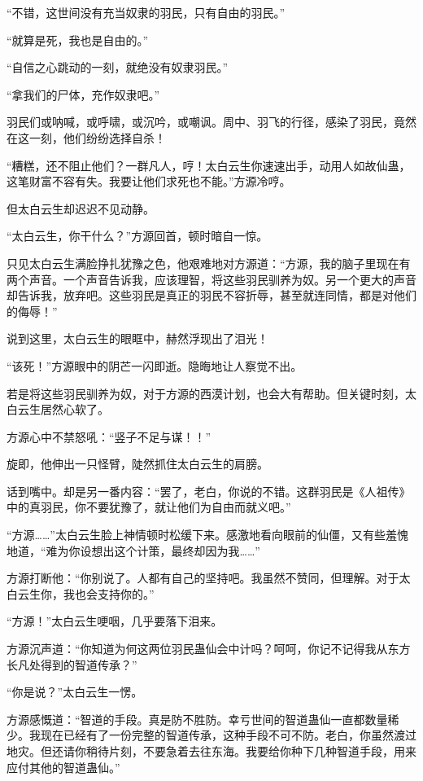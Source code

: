 \begin{this_body}
“不错，这世间没有充当奴隶的羽民，只有自由的羽民。”

“就算是死，我也是自由的。”

“自信之心跳动的一刻，就绝没有奴隶羽民。”

“拿我们的尸体，充作奴隶吧。”

羽民们或呐喊，或呼啸，或沉吟，或嘲讽。周中、羽飞的行径，感染了羽民，竟然在这一刻，他们纷纷选择自杀！

“糟糕，还不阻止他们？一群凡人，哼！太白云生你速速出手，动用人如故仙蛊，这笔财富不容有失。我要让他们求死也不能。”方源冷哼。

但太白云生却迟迟不见动静。

“太白云生，你干什么？”方源回首，顿时暗自一惊。

只见太白云生满脸挣扎犹豫之色，他艰难地对方源道：“方源，我的脑子里现在有两个声音。一个声音告诉我，应该理智，将这些羽民驯养为奴。另一个更大的声音却告诉我，放弃吧。这些羽民是真正的羽民不容折辱，甚至就连同情，都是对他们的侮辱！”

说到这里，太白云生的眼眶中，赫然浮现出了泪光！

“该死！”方源眼中的阴芒一闪即逝。隐晦地让人察觉不出。

若是将这些羽民驯养为奴，对于方源的西漠计划，也会大有帮助。但关键时刻，太白云生居然心软了。

方源心中不禁怒吼：“竖子不足与谋！！”

旋即，他伸出一只怪臂，陡然抓住太白云生的肩膀。

话到嘴中。却是另一番内容：“罢了，老白，你说的不错。这群羽民是《人祖传》中的真羽民，你不要犹豫了，就让他们为自由而就义吧。”

“方源……”太白云生脸上神情顿时松缓下来。感激地看向眼前的仙僵，又有些羞愧地道，“难为你设想出这个计策，最终却因为我……”

方源打断他：“你别说了。人都有自己的坚持吧。我虽然不赞同，但理解。对于太白云生你，我也会支持你的。”

“方源！”太白云生哽咽，几乎要落下泪来。

方源沉声道：“你知道为何这两位羽民蛊仙会中计吗？呵呵，你记不记得我从东方长凡处得到的智道传承？”

“你是说？”太白云生一愣。

方源感慨道：“智道的手段。真是防不胜防。幸亏世间的智道蛊仙一直都数量稀少。我现在已经有了一份完整的智道传承，这种手段不可不防。老白，你虽然渡过地灾。但还请你稍待片刻，不要急着去往东海。我要给你种下几种智道手段，用来应付其他的智道蛊仙。”


\end{this_body}
